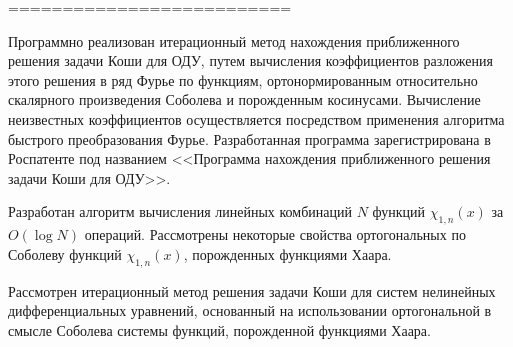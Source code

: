 

%
%












==========================




Программно реализован итерационный метод нахождения приближенного решения задачи Коши для ОДУ, путем вычисления коэффициентов разложения этого решения в ряд Фурье по функциям, ортонормированным
относительно скалярного произведения Соболева и порожденным косинусами.
Вычисление неизвестных коэффициентов осуществляется посредством применения алгоритма быстрого преобразования Фурье. Разработанная программа зарегистрирована в Роспатенте под названием <<Программа нахождения приближенного решения задачи Коши для ОДУ>>.


Разработан алгоритм вычисления линейных комбинаций $N$ функций $\chi_{1,n}(x)$ за $O(\log N)$ операций.
Рассмотрены некоторые свойства ортогональных по Соболеву функций $\chi_{1,n}(x)$, порожденных функциями Хаара.


Рассмотрен итерационный метод решения задачи Коши для систем нелинейных дифференциальных уравнений, основанный на использовании ортогональной в смысле Соболева системы функций, порожденной функциями Хаара.










